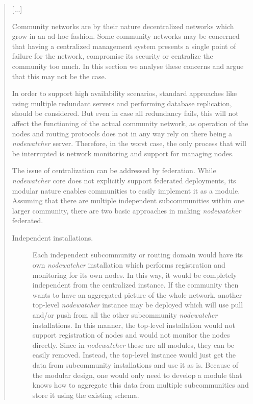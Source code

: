 \documentclass[12pt,twoside,a4paper]{report}
\newcommand{\nodewatcher}{\textit{nodewatcher}}
\begin{document}
\begin{quote}
[...]

Community networks are by their nature decentralized networks which grow in an ad-hoc fashion.
Some community networks may be concerned that having a centralized management system presents a single point of failure for the network, compromise its security or centralize the community too much.
In this section we analyse these concerns and argue that this may not be the case.

In order to support high availability scenarios, standard approaches like using multiple redundant servers and performing database replication, should be considered.
But even in case all redundancy fails, this will not affect the functioning of the actual community network, as operation of the nodes and routing protocols does not in any way rely on there being a \nodewatcher{} server.
Therefore, in the worst case, the only process that will be interrupted is network monitoring and support for managing nodes.

The issue of centralization can be addressed by federation. 
While \nodewatcher{} core does not explicitly support federated deployments, its modular nature enables communities to easily implement it as a module.
Assuming that there are multiple independent subcommunities within one larger community, there are two basic approaches in making \nodewatcher{} federated.

\begin{description}
    \item[Independent installations.] Each independent subcommunity or routing domain would have its own \nodewatcher{} installation which performs registration and monitoring for its own nodes.
    In this way, it would be completely independent from the centralized instance.
    If the community then wants to have an aggregated picture of the whole network, another top-level \nodewatcher{} instance may be deployed which will use pull and/or push from all the other subcommunity \nodewatcher{} installations.
    In this manner, the top-level installation would not support registration of nodes and would not monitor the nodes directly.
    Since in \nodewatcher{} these are all modules, they can be easily removed.
    Instead, the top-level instance would just get the data from subcommunity installations and use it as is.
    Because of the modular design, one would only need to develop a module that knows how to aggregate this data from multiple subcommunities and store it using the existing schema.


\end{description}
\end{quote}
\end{document}
